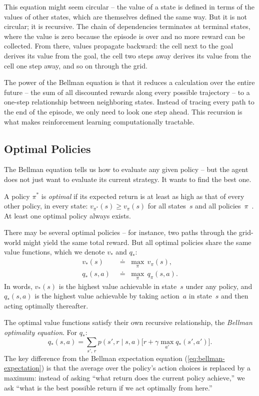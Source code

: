 \smallskip
This equation might seem circular -- the value of a state is defined
in terms of the values of other states, which are themselves defined
the same way. But it is not circular; it is recursive. The chain of
dependencies terminates at terminal states, where the value is zero
because the episode is over and no more reward can be collected. From
there, values propagate backward: the cell next to the goal derives
its value from the goal, the cell two steps away derives its value
from the cell one step away, and so on through the grid.

\smallskip
The power of the Bellman equation is that it reduces a calculation
over the entire future -- the sum of all discounted rewards along
every possible trajectory -- to a one-step relationship between
neighboring states. Instead of tracing every path to the end of the
episode, we only need to look one step ahead. This recursion is what
makes reinforcement learning computationally tractable.

\subsection{Optimal Policies}
\label{subsec:optimal-policies}

The Bellman equation tells us how to evaluate any given policy -- but
the agent does not just want to evaluate its current strategy. It
wants to find the best one.

\smallskip
A policy $\pi^*$ is \emph{optimal} if its expected return is at least
as high as that of every other policy, in every state:
$v_{\pi^*}(s) \geq v_\pi(s)$ for all states~$s$ and all
policies~$\pi$~\citep{sutton2018reinforcement}. At least one optimal
policy always exists.

\smallskip
There may be several optimal policies -- for instance, two paths
through the grid-world might yield the same total reward. But all
optimal policies share the same value functions, which we denote
$v_*$ and $q_*$:
%
\begin{align}
\label{eq:v-star}
v_*(s) &\;\doteq\; \max_\pi\, v_\pi(s), \\[4pt]
\label{eq:q-star}
q_*(s, a) &\;\doteq\; \max_\pi\, q_\pi(s, a).
\end{align}
%
In words, $v_*(s)$ is the highest value achievable in state~$s$ under
any policy, and $q_*(s, a)$ is the highest value achievable by taking
action~$a$ in state~$s$ and then acting optimally thereafter.

\smallskip
The optimal value functions satisfy their own recursive relationship,
the \emph{Bellman optimality equation}. For $q_*$:
%
\begin{equation}
\label{eq:bellman-optimality-q}
q_*(s, a) = \sum_{s',\, r} p(s', r \mid s, a)
  \Big[r + \gamma \max_{a'} q_*(s', a')\Big].
\end{equation}
%
The key difference from the Bellman expectation equation
(\cref{eq:bellman-expectation}) is that the average over the policy's
action choices is replaced by a maximum: instead of asking ``what
return does the current policy achieve,'' we ask ``what is the best
possible return if we act optimally from here.''

